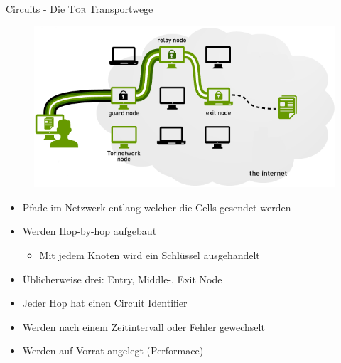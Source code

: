 \documentclass{beamer}
\begin{document}
\begin{frame}{Circuits - Die \textsc{Tor} Transportwege}
  \begin{figure}
    \includegraphics[width=.6\textwidth]{pics/tor}
  \end{figure}
  \begin{itemize}
    \item Pfade im Netzwerk entlang welcher die Cells gesendet werden
    \item Werden Hop-by-hop aufgebaut
    \begin{itemize}
      \item Mit jedem Knoten wird ein Schlüssel ausgehandelt
    \end{itemize}
    \item Üblicherweise drei: Entry\-, Middle-, Exit Node
    \item Jeder Hop hat einen Circuit Identifier
    \item Werden nach einem Zeitintervall oder Fehler gewechselt
    \item Werden auf Vorrat angelegt (Performace)
  \end{itemize}
\end{frame}
\end{document}
